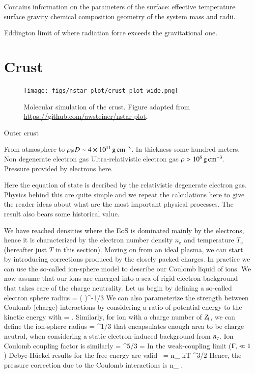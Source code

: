 Contains information on the parameters of the surface:
effective temperature
surface gravity
chemical composition
geometry of the system
mass and radii.


Eddington limit of where radiation force exceeds the gravitational one.


\section{Crust}

\begin{figure}
\centering
\texttt{[image: figs/nstar-plot/crust\_plot\_wide.png]}
\caption{\label{fig:crust}
Molecular simulation of the crust.
Figure adapted from \url{https://github.com/awsteiner/nstar-plot}.
}
\end{figure}

Outer crust

From atmosphere to $\rho_ND \sim 4 \times 10^{11} \, \mathrm{g}\,\mathrm{cm}^{-3} $.
In thickness some hundred meters.
Non degenerate electron gas
Ultra-relativistic electron gas $\rho > 10^6 \, \mathrm{g}\,\mathrm{cm}^{-3} $.
Pressure provided by electrons here.

Here the equation of state is decribed by the relativistic degenerate electron gas.
Physics behind this are quite simple and we repeat the calculations here to give the reader ideas about what are the most important physical processes.
The result also bears some historical value.

We have reached densities where the EoS is dominated mainly by the electrons, hence it is characterized by the electron number density $n_{\mathrm{e}}$ and temperature $T_{\mathrm{e}}$ (hereafter just $T$ in this section).
Moving on from an ideal plasma, we can start by introducing corrections produced by the closely packed charges.
In practice we can use the so-called ion-sphere model to describe our Coulomb liquid of ions.
We now assume that our ions are emerged into a sea of rigid electron background that takes care of the charge neutrality.
Let us begin by defining a so-called electron sphere radius
\be
\erad = \left(  \right)^{-1/3}
\ee
We can also parameterize the strength between Coulomb (charge) interactions by considering a ratio of potential energy to the kinetic energy with
\be
\Ge = .
\ee
Similarly, for ion with a charge number of $Z_{\mathrm{i}}$, we can define the ion-sphere radius
\be
\irad = \erad \Zi^{1/3}
\ee
that encapsulates enough area to be charge neutral, when considering a static electron-induced background from $n_{\mathrm{e}}$.
Ion Coulomb coupling factor is similarly
\be
\Gi = \Ge \Zi^{5/3} = 
\ee
In the weak-coupling limit ($\Gamma_{\mathrm{i}} \ll 1$) Debye-H\"uckel results for the free energy are valid\cite{LL80}
\be
{} =  n_{} kT \Gamma^{3/2}
\ee
Hence, the pressure correction due to the Coulomb interactions is\cite{DeWitt96}
\be
\Pii {} n_{} .
\ee



